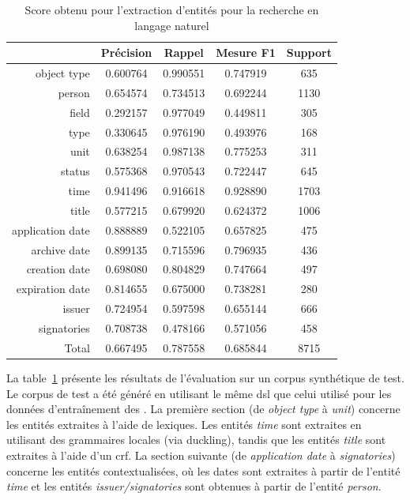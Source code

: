 \begin{table}[htb]
    \centering
    \begin{tabular}{r|cccc}
                         & Précision      & Rappel         & Mesure F1      & Support    \\
        \hline
        \hline
        object type      & \num{0,600764} & \num{0,990551} & \num{0,747919} & \num{ 635} \\
        person           & \num{0,654574} & \num{0,734513} & \num{0,692244} & \num{1130} \\
        field            & \num{0,292157} & \num{0,977049} & \num{0,449811} & \num{ 305} \\
        type             & \num{0,330645} & \num{0,976190} & \num{0,493976} & \num{ 168} \\
        unit             & \num{0,638254} & \num{0,987138} & \num{0,775253} & \num{ 311} \\
        status           & \num{0,575368} & \num{0,970543} & \num{0,722447} & \num{ 645} \\
        \hline
        time             & \num{0,941496} & \num{0,916618} & \num{0,928890} & \num{1703} \\
        title            & \num{0,577215} & \num{0,679920} & \num{0,624372} & \num{1006} \\
        \hline
        application date & \num{0,888889} & \num{0,522105} & \num{0,657825} & \num{ 475} \\
        archive date     & \num{0,899135} & \num{0,715596} & \num{0,796935} & \num{ 436} \\
        creation date    & \num{0,698080} & \num{0,804829} & \num{0,747664} & \num{ 497} \\
        expiration date  & \num{0,814655} & \num{0,675000} & \num{0,738281} & \num{ 280} \\
        issuer           & \num{0,724954} & \num{0,597598} & \num{0,655144} & \num{ 666} \\
        signatories      & \num{0,708738} & \num{0,478166} & \num{0,571056} & \num{ 458} \\
        \hline
        Total            & \num{0,667495} & \num{0,787558} & \num{0,685844} & \num{8715}
    \end{tabular}
    \caption{Score obtenu pour l'extraction d'entités pour la recherche en langage naturel}
    \label{tab:nl-query:result}
\end{table}

La table~\ref{tab:nl-query:result} présente les résultats de l'évaluation sur un corpus synthétique de test.
Le corpus de test a été généré en utilisant le même  \gls{dsl} que celui utilisé pour les données d'entraînement des .
La première section (de \emph{object type} à \emph{unit}) concerne les entités extraites à l'aide de lexiques.
Les entités \emph{time} sont extraites en utilisant des grammaires locales (via \gls{duckling}), tandis que les entités \emph{title} sont extraites à l'aide d'un \gls{crf}.
La section suivante (de \emph{application date} à \emph{signatories}) concerne les entités contextualisées, où les dates sont extraites à partir de l'entité \emph{time} et les entités \emph{issuer/signatories} sont obtenues à partir de l'entité \emph{person}.

